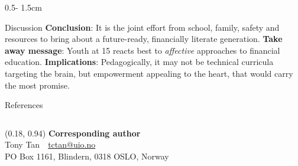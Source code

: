 \documentclass{uioposter}
\begin{document}
\begin{frame}
\begin{columns}[onlytextwidth]
\begin{column}{0.5\textwidth - 1.5cm}
\begin{block}{Discussion}
        \textbf{Conclusion}: It is the joint effort from school, family, safety and resources to bring about a future-ready, financially literate generation. \textbf{Take away message}: Youth at 15 reacts best to \emph{affective} approaches to financial education. \textbf{Implications}: Pedagogically, it may not be technical curricula targeting the brain, but empowerment appealing to the heart, that would carry the most promise.
    \end{block}

    \begin{block}{References}
        \renewcommand*{\bibfont}{\tiny}
        \printbibliography
    \end{block}

\end{column}

\end{columns}

\begin{textblock}{0.5}(0.18, 0.94)
    \color{white}
    \sffamily
    \textbf{Corresponding author}
    \\
    Tony Tan\ \ \url{tctan@uio.no}\\
    PO Box 1161, Blindern, 0318 OSLO, Norway
\end{textblock}

\end{frame}
\end{document}
